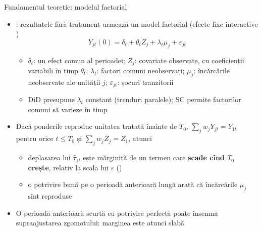 \begin{frame}{Fundamentul teoretic: modelul factorial}
\itemsize{\small}
\begin{itemize}
    \item {}: rezultatele fără tratament urmează un model factorial (efecte fixe interactive ) \[ Y_{jt}(0) = \delta_t + \theta_tZ_j + \lambda_t\mu_j + \varepsilon_{jt} \]
    \begin{itemize}
        \item $\delta_t$: un efect comun al perioadei; $Z_j$: covariate observate, cu coeficienții variabili în timp $\theta_t$; $\lambda_t$: factori comuni neobservați; $\mu_j$: încărcările neobservate ale unității $j$; $\varepsilon_{jt}$: șocuri tranzitorii
        \item DiD presupune $\lambda_t$ constant (trenduri paralele); SC permite factorilor comuni să varieze în timp
    \end{itemize}
    \item Dacă ponderile reproduc unitatea tratată înainte de $T_0$, $\sum_j w_jY_{jt} = Y_{1t}$ pentru orice $t \le T_0$ și $\sum_j w_jZ_j = Z_1$, atunci
    \begin{itemize}
        \item deplasarea lui $\hat\tau_{1t}$ este mărginită de un termen care \textbf{scade cînd $T_0$ crește}, relativ la scala lui $\varepsilon$ ()
        \item o potrivire bună pe o perioadă anterioară lungă arată că încărcările $\mu_j$ sînt reproduse
    \end{itemize}
    \item O perioadă anterioară scurtă cu potrivire perfectă poate însemna supraajustarea zgomotului: marginea este atunci slabă 
\end{itemize}
\end{frame}


